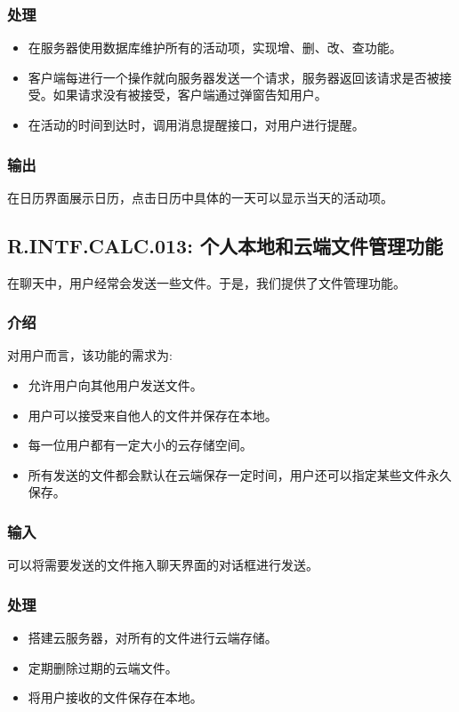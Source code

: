 \subsubsection{处理}
\begin{itemize}
  \item 在服务器使用数据库维护所有的活动项，实现增、删、改、查功能。
  \item 客户端每进行一个操作就向服务器发送一个请求，服务器返回该请求是否被接受。如果请求没有被接受，客户端通过弹窗告知用户。
  \item 在活动的时间到达时，调用消息提醒接口，对用户进行提醒。
\end{itemize}
\subsubsection{输出}
在日历界面展示日历，点击日历中具体的一天可以显示当天的活动项。

\subsection{R.INTF.CALC.013: 个人本地和云端文件管理功能}
在聊天中，用户经常会发送一些文件。于是，我们提供了文件管理功能。
\subsubsection{介绍}
对用户而言，该功能的需求为:
\begin{itemize}
  \item 允许用户向其他用户发送文件。
  \item 用户可以接受来自他人的文件并保存在本地。
  \item 每一位用户都有一定大小的云存储空间。
  \item 所有发送的文件都会默认在云端保存一定时间，用户还可以指定某些文件永久保存。
\end{itemize}
\subsubsection{输入}
可以将需要发送的文件拖入聊天界面的对话框进行发送。
\subsubsection{处理}
\begin{itemize}
  \item 搭建云服务器，对所有的文件进行云端存储。
  \item 定期删除过期的云端文件。
  \item 将用户接收的文件保存在本地。
\end{itemize}
